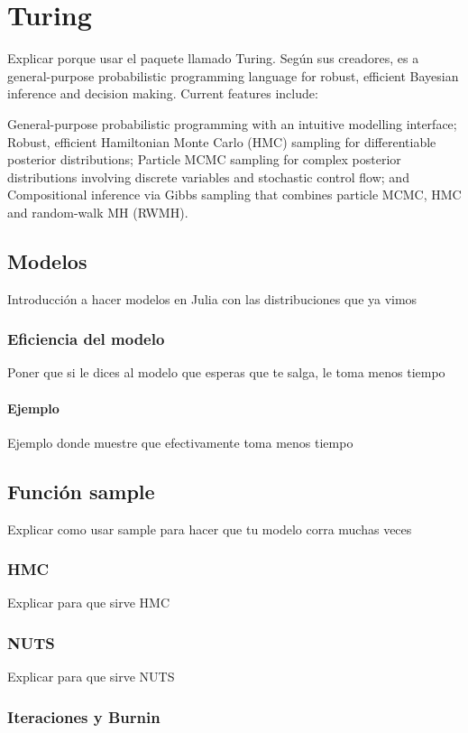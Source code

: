 \chapter{Turing}
Explicar porque usar el paquete llamado Turing. Según sus creadores, es a general-purpose probabilistic programming language for robust, efficient Bayesian inference and decision making. Current features include:

General-purpose probabilistic programming with an intuitive modelling interface;
Robust, efficient Hamiltonian Monte Carlo (HMC) sampling for differentiable posterior distributions;
Particle MCMC sampling for complex posterior distributions involving discrete variables and stochastic control flow; and
Compositional inference via Gibbs sampling that combines particle MCMC, HMC and random-walk MH (RWMH).

\section{Modelos}
Introducción a hacer modelos en Julia con las distribuciones que ya vimos

\subsection{Eficiencia del modelo}
Poner que si le dices al modelo que esperas que te salga, le toma menos tiempo

\subsubsection{Ejemplo}
Ejemplo donde muestre que efectivamente toma menos tiempo

\section{Función sample}
Explicar como usar sample para hacer que tu modelo corra muchas veces

\subsection{HMC}
Explicar para que sirve HMC

\subsection{NUTS}
Explicar para que sirve NUTS

\subsection{Iteraciones y Burnin}

